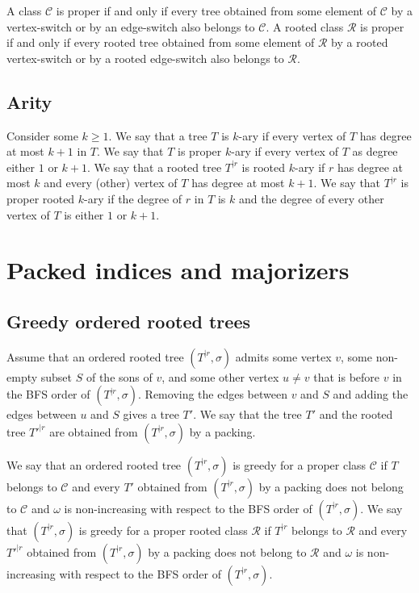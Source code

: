 \documentclass[11 pt]{modarticle}
\newcommand{\wmap}{\omega}
\newcommand{\rtree}[2]{{#1}^{\lvert #2}}
\newcommand{\ortree}[3]{(\rtree{#1}{#2},{#3})}
\newcommand{\tclass}{\mathcal{C}}
\newcommand{\rtclass}{\mathcal{R}}
\begin{document}
\begin{rem}\label{rem:proper}
A class $\tclass$ is proper if and only if every tree obtained from some element of $\tclass$ by a vertex-switch or by an edge-switch also belongs to $\tclass$. A rooted class $\rtclass$ is proper if and only if every rooted tree obtained from some element of $\rtclass$ by a rooted vertex-switch or by a rooted edge-switch also belongs to $\rtclass$.
\end{rem}

\subsection{Arity}

Consider some $k \geq 1$. We say that a tree $T$ is $k$-ary if every vertex of $T$ has degree at most $k+1$ in $T$. We say that $T$ is proper $k$-ary if every vertex of $T$ as degree either $1$ or $k+1$. We say that a rooted tree $\rtree{T}{r}$ is rooted $k$-ary if $r$ has degree at most $k$ and every (other) vertex of $T$ has degree at most $k+1$. We say that $\rtree{T}{r}$ is proper rooted $k$-ary if the degree of $r$ in $T$ is $k$ and the degree of every other vertex of $T$ is either $1$ or $k+1$. 


\section{Packed indices and majorizers}

\subsection{Greedy ordered rooted trees}

\begin{defi}
Assume that an ordered rooted tree $\ortree{T}{r}{\sigma}$ admits some vertex $v$, some non-empty subset $S$ of the sons of $v$, and some other vertex $u \neq v$ that is before $v$ in the BFS order of $\ortree{T}{r}{\sigma}$. Removing the edges between $v$ and $S$ and adding the edges between $u$ and $S$ gives a tree $T'$. We say that the tree $T'$ and the rooted tree $\rtree{T'}{r}$ are obtained from $\ortree{T}{r}{\sigma}$ by a packing.
\end{defi}

\begin{defi}
We say that an ordered rooted tree $\ortree{T}{r}{\sigma}$ is greedy for a proper class $\tclass$ if $T$ belongs to $\tclass$ and every $T'$ obtained from $\ortree{T}{r}{\sigma}$ by a packing does not belong to $\tclass$ and $\wmap$ is non-increasing with respect to the BFS order of $\ortree{T}{r}{\sigma}$. We say that $\ortree{T}{r}{\sigma}$ is greedy for a proper rooted class $\rtclass$ if $\rtree{T}{r}$ belongs to $\rtclass$ and every $\rtree{T'}{r}$ obtained from $\ortree{T}{r}{\sigma}$ by a packing does not belong to $\rtclass$ and $\wmap$ is non-increasing with respect to the BFS order of $\ortree{T}{r}{\sigma}$.
\end{defi}
\end{document}

